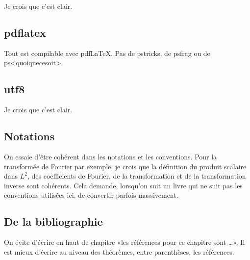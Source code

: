 Je crois que c'est clair.

\subsection{pdflatex}

Tout est compilable avec pdf\LaTeX. Pas de pstricks, de psfrag ou de ps<quoiquecesoit>.

\subsection{utf8}

Je crois que c'est clair.

\subsection{Notations}

On essaie d'être cohérent dans les notations et les conventions. Pour la transformée de Fourier par exemple, je crois que la définition du produit scalaire dans \( L^2\), des coefficients de Fourier, de la transformation et de la transformation inverse sont cohérents. Cela demande, lorsqu'on suit un livre qui ne suit pas les conventions utilisées ici, de convertir parfois massivement.

\subsection{De la bibliographie}

On évite d'écrire en haut de chapitre «les références pour ce chapitre sont \ldots». Il est mieux d'écrire au niveau des théorèmes, entre parenthèses, les références.

